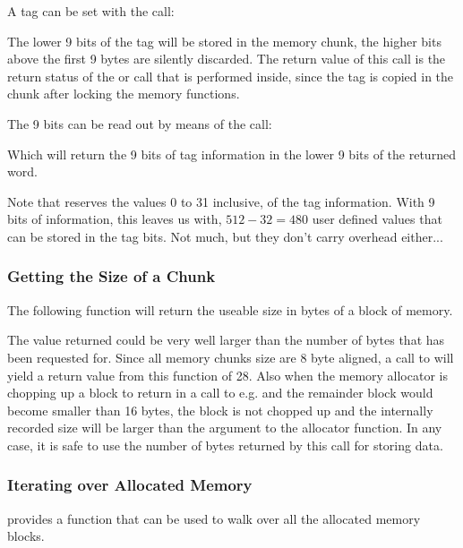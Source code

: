 A tag can be set with the call:


The lower 9 bits of the tag will be stored in the memory chunk, the higher
bits above the first 9 bytes are silently discarded. The return value of
this call is the return status of the  or
 call that is performed inside, since the tag is
copied in the chunk after locking the memory functions.

The 9 bits can be read out by means of the call:


Which will return the 9 bits of tag information in the lower 9 bits of the
returned word.

Note that \oswald reserves the values 0 to 31 inclusive, of the tag
information. With 9 bits of information, this leaves us with, $512 - 32 =
480$ user defined values that can be stored in the tag bits. Not much, but
they don't carry overhead either...

\subsubsection{Getting the Size of a Chunk}

The following function will return the useable size in bytes of a block of
memory.


The value returned could be very well larger than the number of bytes that
has been requested for. Since all memory chunks size are 8 byte aligned, a
call to  will yield a return value from this
function of 28. Also when the memory allocator is chopping up a block to
return in a call to e.g.  and the remainder block
would become smaller than 16 bytes, the block is not chopped up and the
internally recorded size will be larger than the argument to the allocator
function. In any case, it is safe to use the number of bytes returned by
this call for storing data.

\subsubsection{Iterating over Allocated Memory}

\oswald provides a function that can be used to walk over all the allocated
memory blocks.

